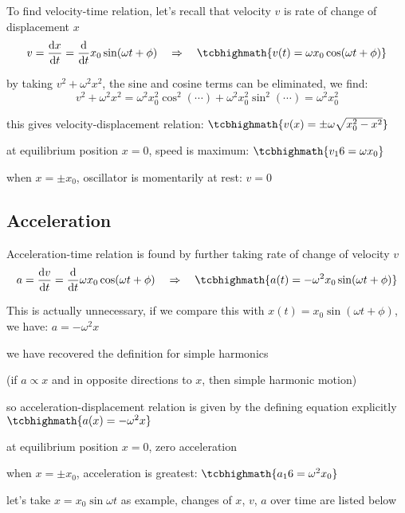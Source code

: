 To find velocity-time relation, let's recall that velocity $v$ is rate of change of displacement $x$
\begin{equation*}
	v = \frac{\dd x}{\dd t} = \frac{\dd}{\dd t} x_0\sin(\omega t+\phi) \RA \tcbhighmath{v(t) = \omega x_0 \cos(\omega t+\phi)}
\end{equation*}

by taking $v^2 + \omega^2 x^2$, the sine and cosine terms can be eliminated, we find:
\begin{equation*}
	v^2 + \omega^2 x^2 = \omega^2 x_0^2 \cos^2(\cdots) + \omega^2 x_0^2 \sin^2(\cdots) = \omega^2 x_0^2
\end{equation*}

this gives velocity-displacement relation: $\tcbhighmath{v(x)=\pm \omega\sqrt{x_0^2 - x^2}}$

\cmt at equilibrium position $x=0$, speed is maximum: $\tcbhighmath{v_\tmax = \omega x_0}$ 

\cmt when $x=\pm x_0$, oscillator is momentarily at rest: $v=0$ 

\subsection*{Acceleration}

Acceleration-time relation is found by further taking rate of change of velocity $v$
\begin{equation*}
a = \frac{\dd v}{\dd t} = \frac{\dd}{\dd t} \omega x_0 \cos(\omega t+\phi) \RA \tcbhighmath{a(t) = - \omega^2 x_0 \sin(\omega t+\phi)}
\end{equation*}

This is actually unnecessary, if we compare this with $x(t)=x_0 \sin(\omega t+\phi)$, we have: $a=-\omega^2 x$

we have recovered the definition for simple harmonics

(if $a \propto x$ and in opposite directions to $x$, then simple harmonic motion)

so acceleration-displacement relation is given by the defining equation explicitly $\tcbhighmath{a(x) = -\omega^2 x} $

\cmt at equilibrium position $x=0$, zero acceleration

\cmt when $x=\pm x_0$, acceleration is greatest: $\tcbhighmath{a_\tmax = \omega^2 x_0}$ 

\vspace*{\baselineskip}

let's take $x=x_0\sin\omega t$ as example, changes of $x$, $v$, $a$ over time are listed below

